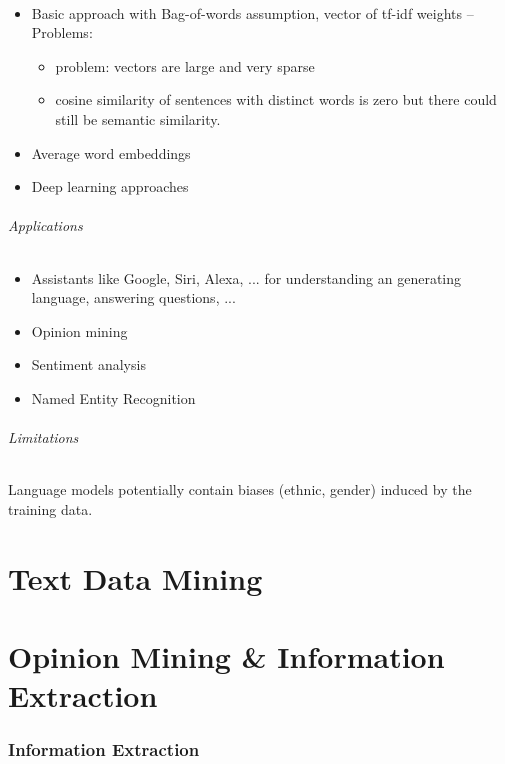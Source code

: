 \documentclass[10pt,twocolumn]{article}
\begin{document}
\paragraph{} \begin{itemize}
\item Basic approach with Bag-of-words assumption, vector of tf-idf weights -- Problems:
  \begin{itemize}
  \item problem: vectors are large and very sparse
  \item cosine similarity of sentences with distinct words is zero but there
    could still be semantic similarity.
  \end{itemize}
\item Average word embeddings
\item Deep learning approaches
\end{itemize}

\paragraph{\textit{Applications}}
\begin{itemize}
\item Assistants like Google, Siri, Alexa, ... for understanding an generating
  language, answering questions, ...
\item Opinion mining
\item Sentiment analysis
\item Named Entity Recognition
\end{itemize}

\paragraph{\textit{Limitations}} Language models potentially contain biases
(ethnic, gender) induced by the training data.






\pagebreak
\part{Text Data Mining}

\pagebreak
\part{Opinion Mining \& Information Extraction}

\section{Information Extraction}
\end{document}
